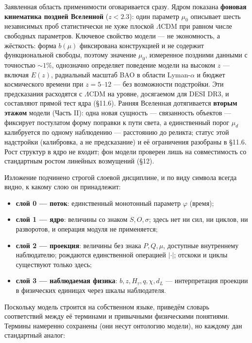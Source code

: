 \documentclass{article}
\begin{document}
Заявленная область применимости оговаривается сразу. Ядром показана \textbf{фоновая кинематика поздней Вселенной} ($z < 2.3$): один параметр $\mu_0$ описывает шесть независимых проб статистически не хуже плоской $\Lambda$CDM при равном числе свободных параметров. Ключевое свойство модели --- не экономность, а жёсткость: форма $b(\mu)$ фиксирована конструкцией и не содержит функциональной свободы, поэтому значение $\mu_0$, измеренное поздними данными с точностью ${\sim}1\%$, однозначно определяет поведение модели на высоком $z$ --- включая $E(z)$, радиальный масштаб BAO в области Lyman-$\alpha$ и бюджет космического времени при $z = 5\text{--}12$ --- без возможности подстройки. Эти предсказания расходятся с $\Lambda$CDM на уровне, досягаемом для DESI DR3, и составляют прямой тест ядра (\S11.6). Ранняя Вселенная дотягивается \textbf{вторым этажом} модели (Часть II): одна новая сущность --- связанность объектов --- фиксирует постулатом форму поправки к пути света, а единственный порог $\mu_d$ калибруется по одному наблюдению --- расстоянию до реликта; статус этой надстройки (калибровка, а не предсказание) и её ограничения разобраны в \S11.6. Рост структур в ядро не входит; фон модели проверен лишь на совместимость со стандартным ростом линейных возмущений (\S12).

Изложение подчинено строгой слоевой дисциплине, и по виду символа всегда видно, к какому слою он принадлежит:
\begin{itemize}
  \item \textbf{слой 0 --- поток}: единственный монотонный параметр $\varphi$ (время);
  \item \textbf{слой 1 --- ядро}: величины со знаком $S, O, \sigma$; здесь нет ни сил, ни циклов, ни разворотов, и операция модуля не применяется;
  \item \textbf{слой 2 --- проекция}: величины без знака $P, Q, \mu$, доступные внутреннему наблюдателю; рождаются единственной операцией $|\cdot|$; отскоки и циклы существуют только здесь;
  \item \textbf{слой 3 --- наблюдаемая физика}: $b, z, H_\tau, q, \chi, d_L$ --- интерпретация проекции в физических единицах через шкалы наблюдателя.
\end{itemize}

Поскольку модель строится на собственном языке, приведём словарь соответствий между её терминами и привычными физическими понятиями. Термины намеренно сохранены (они несут онтологию модели), но каждому дан стандартный аналог:
\end{document}
